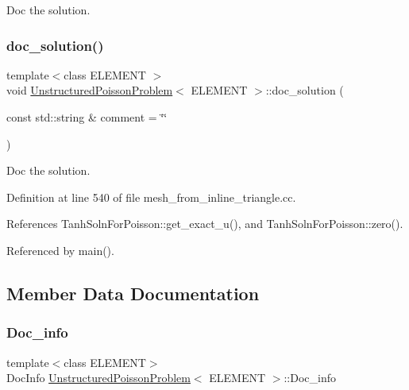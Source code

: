 Doc the solution. 

\mbox{\label{classUnstructuredPoissonProblem_a9b21a3c3f574da71411f852006fe2a0c}} 
\subsubsection{\texorpdfstring{doc\+\_\+solution()}{doc\_solution()}\hspace{0.1cm}{\footnotesize\ttfamily [2/2]}}
{\footnotesize\ttfamily template$<$class E\+L\+E\+M\+E\+NT $>$ \\
void \hyperlink{classUnstructuredPoissonProblem}{Unstructured\+Poisson\+Problem}$<$ E\+L\+E\+M\+E\+NT $>$\+::doc\+\_\+solution (\begin{DoxyParamCaption}\item[{const std\+::string \&}]{comment = {\ttfamily \char`\"{}\char`\"{}} }\end{DoxyParamCaption})}



Doc the solution. 



Definition at line 540 of file mesh\+\_\+from\+\_\+inline\+\_\+triangle.\+cc.



References Tanh\+Soln\+For\+Poisson\+::get\+\_\+exact\+\_\+u(), and Tanh\+Soln\+For\+Poisson\+::zero().



Referenced by main().



\subsection{Member Data Documentation}
\mbox{\label{classUnstructuredPoissonProblem_a5c4c29b1c95cd63055e5aced124ca708}} 
\subsubsection{\texorpdfstring{Doc\+\_\+info}{Doc\_info}}
{\footnotesize\ttfamily template$<$class E\+L\+E\+M\+E\+NT$>$ \\
Doc\+Info \hyperlink{classUnstructuredPoissonProblem}{Unstructured\+Poisson\+Problem}$<$ E\+L\+E\+M\+E\+NT $>$\+::Doc\+\_\+info\hspace{0.3cm}{\ttfamily [private]}}



